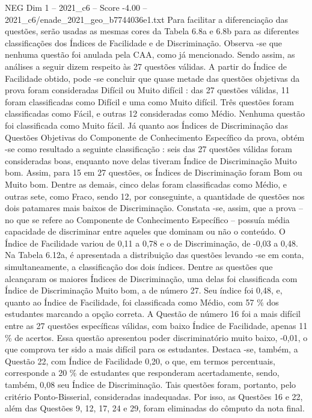 \begin{textsample}{NEG Dim 1 – 2021\_c6 – Score -4.00 – 2021\_c6/enade\_2021\_geo\_b7744036e1.txt}
Para facilitar a diferenciação das questões, serão usadas as mesmas cores da Tabela 6.8a e 6.8b para as diferentes classificações dos Índices de Facilidade e de Discriminação.
Observa -se que nenhuma questão foi anulada pela CAA, como já mencionado.
Sendo assim, as análises a seguir dizem respeito às 27 questões válidas.
A partir do Índice de Facilidade obtido, pode -se concluir que quase metade das questões objetivas da prova foram consideradas Difícil ou Muito difícil : das 27 questões válidas, 11 foram classificadas como Difícil e uma como Muito difícil.
Três questões foram classificadas como Fácil, e outras 12 consideradas como Médio.
Nenhuma questão foi classificada como Muito fácil.
Já quanto aos Índices de Discriminação das Questões Objetivas do Componente de Conhecimento Específico da prova, obtém -se como resultado a seguinte classificação : seis das 27 questões válidas foram consideradas boas, enquanto nove delas tiveram Índice de Discriminação Muito bom.
Assim, para 15 em 27 questões, os Índices de Discriminação foram Bom ou Muito bom.
Dentre as demais, cinco delas foram classificadas como Médio, e outras sete, como Fraco, sendo 12, por conseguinte, a quantidade de questões nos dois patamares mais baixos de Discriminação.
Constata -se, assim, que a prova – no que se refere ao Componente de Conhecimento Específico – possuía média capacidade de discriminar entre aqueles que dominam ou não o conteúdo.
O Índice de Facilidade variou de 0,11 a 0,78 e o de Discriminação, de -0,03 a 0,48.
Na Tabela 6.12a, é apresentada a distribuição das questões levando -se em conta, simultaneamente, a classificação dos dois índices.
Dentre as questões que alcançaram os maiores Índices de Discriminação, uma delas foi classificada com Índice de Discriminação Muito bom, a de número 27.
Seu índice foi 0,48, e, quanto ao Índice de Facilidade, foi classificada como Médio, com 57 \% dos estudantes marcando a opção correta.
A Questão de número 16 foi a mais difícil entre as 27 questões específicas válidas, com baixo Índice de Facilidade, apenas 11 \% de acertos.
Essa questão apresentou poder discriminatório muito baixo, -0,01, o que comprova ter sido a mais difícil para os estudantes.
Destaca -se, também, a Questão 22, com Índice de Facilidade 0,20, o que, em termos percentuais, corresponde a 20 \% de estudantes que responderam acertadamente, sendo, também, 0,08 seu Índice de Discriminação.
Tais questões foram, portanto, pelo critério Ponto-Bisserial, consideradas inadequadas.
Por isso, as Questões 16 e 22, além das Questões 9, 12, 17, 24 e 29, foram eliminadas do cômputo da nota final.

\end{textsample}
